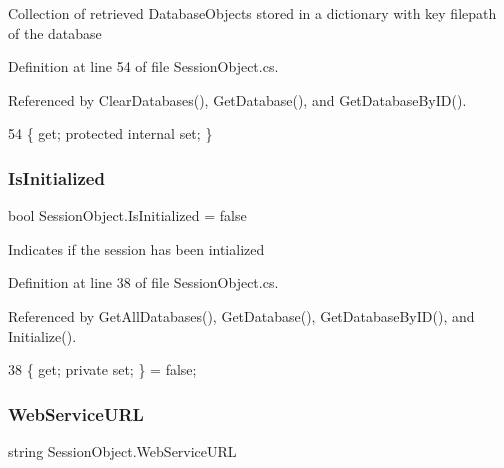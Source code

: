Collection of retrieved Database\+Objects stored in a dictionary with key filepath of the database 



Definition at line 54 of file Session\+Object.\+cs.



Referenced by Clear\+Databases(), Get\+Database(), and Get\+Database\+By\+I\+D().


\begin{DoxyCode}
54 \{ \textcolor{keyword}{get}; \textcolor{keyword}{protected} \textcolor{keyword}{internal} \textcolor{keyword}{set}; \}
\end{DoxyCode}
\mbox{\label{class_session_object_ae0885b9054fc3ce287307ac16ff69990}} 
\subsubsection{\texorpdfstring{Is\+Initialized}{IsInitialized}}
{\footnotesize\ttfamily bool Session\+Object.\+Is\+Initialized = false\hspace{0.3cm}{\ttfamily [get]}}



Indicates if the session has been intialized 



Definition at line 38 of file Session\+Object.\+cs.



Referenced by Get\+All\+Databases(), Get\+Database(), Get\+Database\+By\+I\+D(), and Initialize().


\begin{DoxyCode}
38 \{ \textcolor{keyword}{get}; \textcolor{keyword}{private} \textcolor{keyword}{set}; \} = \textcolor{keyword}{false};
\end{DoxyCode}
\mbox{\label{class_session_object_a697c071c812fbf7ad1166b896fb44c16}} 
\subsubsection{\texorpdfstring{Web\+Service\+U\+RL}{WebServiceURL}}
{\footnotesize\ttfamily string Session\+Object.\+Web\+Service\+U\+RL\hspace{0.3cm}{\ttfamily [get]}}



